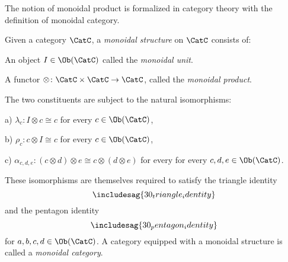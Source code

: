The notion of monoidal product is formalized in category theory with the definition of monoidal category.
\begin{shaded}
\begin{definition}\label{def:monoidal_cat}
Given a category $\CatC$, a \emph{monoidal structure} on $\CatC$ consists of:
\begin{compactenum}
    \item An object $I\in \Ob(\CatC)$ called the \emph{monoidal unit}.
    \item A functor $\otimes \colon \CatC \times \CatC\to \CatC$, called the \emph{monoidal product}.
\end{compactenum}
The two constituents are subject to the natural isomorphisms:
\begin{compactenum}
    \item[a)] $\lambda_c \colon I\otimes c \cong c$ for every $c\in \Ob(\CatC)$,
    \item[b)] $\rho_c \colon c\otimes I \cong c$ for every $c\in \Ob(\CatC)$,
    \item[c)] $\alpha_{c,d,e}\colon (c\otimes d)\otimes e \cong c\otimes (d\otimes e)$ for every for every $c,d,e\in \Ob(\CatC)$.
\end{compactenum}
These isomorphisms are themselves required to satisfy the triangle identity
\begin{equation}
\includesag{30_triangle_identity}
\end{equation}
and the pentagon identity
\begin{equation}
\includesag{30_pentagon_identity}
\end{equation}
for $a,b,c,d\in \Ob(\CatC)$.
\noindent A category equipped with a monoidal structure is called a \emph{monoidal category}.
\end{definition}
\end{shaded}





